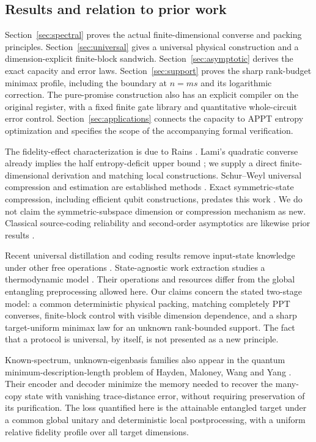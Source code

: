 \subsection{Results and relation to prior work}
Section~\ref{sec:spectral} proves the actual finite-dimensional converse and packing principles. Section~\ref{sec:universal} gives a universal physical construction and a dimension-explicit finite-block sandwich. Section~\ref{sec:asymptotic} derives the exact capacity and error laws. Section~\ref{sec:support} proves the sharp rank-budget minimax profile, including the boundary at $n=ms$ and its logarithmic correction. The pure-promise construction also has an explicit compiler on the original register, with a fixed finite gate library and quantitative whole-circuit error control. Section~\ref{sec:applications} connects the capacity to APPT entropy optimization and specifies the scope of the accompanying formal verification.

The fidelity-effect characterization is due to Rains \cite{rains}. Lami's quadratic converse already implies the half entropy-deficit upper bound \cite{lami}; we supply a direct finite-dimensional derivation and matching local constructions. Schur--Weyl universal compression and estimation are established methods \cite{jhhh,kw,hayashi-univ}. Exact symmetric-state compression, including efficient qubit constructions, predates this work \cite{plesch,baertschi}. We do not claim the symmetric-subspace dimension or compression mechanism as new. Classical source-coding reliability and second-order asymptotics are likewise prior results \cite{hayashi-second}.

Recent universal distillation and coding results remove input-state knowledge under other free operations \cite{takagi,tirone,llf,rizzo}. State-agnostic work extraction studies a thermodynamic model \cite{watanabe,zeng}. Their operations and resources differ from the global entangling preprocessing allowed here. Our claims concern the stated two-stage model: a common deterministic physical packing, matching completely PPT converses, finite-block control with visible dimension dependence, and a sharp target-uniform minimax law for an unknown rank-bounded support. The fact that a protocol is universal, by itself, is not presented as a new principle.

Known-spectrum, unknown-eigenbasis families also appear in the quantum minimum-description-length problem of Hayden, Maloney, Wang and Yang \cite{hayden-qmdl}. Their encoder and decoder minimize the memory needed to recover the many-copy state with vanishing trace-distance error, without requiring preservation of its purification. The loss quantified here is the attainable entangled target under a common global unitary and deterministic local postprocessing, with a uniform relative fidelity profile over all target dimensions.

